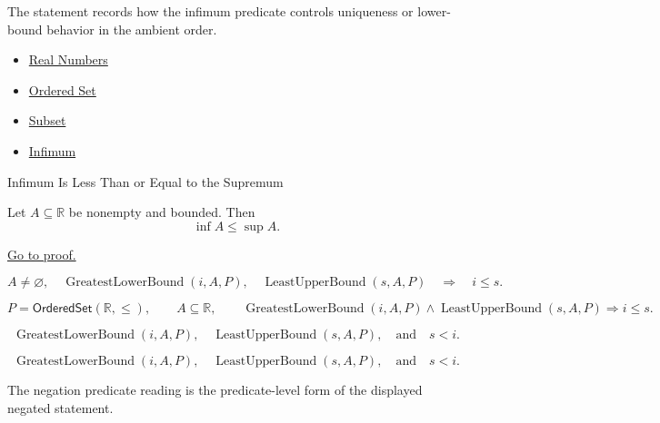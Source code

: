 \begin{remark*}[Interpretation]
The statement records how the infimum predicate controls uniqueness or lower-bound behavior in the ambient order.
\end{remark*}

\begin{dependencies}
\begin{itemize}
  \item \hyperref[def:reals]{Real Numbers}
  \item \hyperref[def:ordered-set]{Ordered Set}
  \item \hyperref[def:subset]{Subset}
  \item \hyperref[def:infimum]{Infimum}
\end{itemize}
\end{dependencies}

\begin{theorembox}{Infimum Is Less Than or Equal to the Supremum}
\begin{theorem}
\label{thm:infimum-less-than-supremum}
Let $A\subseteq\mathbb{R}$ be nonempty and bounded. Then
\[
  \inf A\leq\sup A.
\]

\hyperref[prf:infimum-less-than-supremum]{Go to proof.}
\end{theorem}
\end{theorembox}

\begin{remark*}
\[
  A\neq\varnothing,\quad
  \operatorname{GreatestLowerBound}(i,A,P),\quad
  \operatorname{LeastUpperBound}(s,A,P)
  \quad\Longrightarrow\quad
  i\leq s.
\]
\end{remark*}

\begin{remark*}
\[
  P=\mathsf{OrderedSet}(\mathbb{R},\leq),\qquad A\subseteq\mathbb{R},\qquad
  \operatorname{GreatestLowerBound}(i,A,P)\land\operatorname{LeastUpperBound}(s,A,P)
  \Longrightarrow i\leq s.
\]
\end{remark*}

\begin{remark*}
\[
  \operatorname{GreatestLowerBound}(i,A,P),\quad \operatorname{LeastUpperBound}(s,A,P),
  \quad\text{and}\quad s<i.
\]
\end{remark*}

\begin{remark*}
\[
  \operatorname{GreatestLowerBound}(i,A,P),\quad \operatorname{LeastUpperBound}(s,A,P),
  \quad\text{and}\quad s<i.
\]

The negation predicate reading is the predicate-level form of the displayed negated statement.
\end{remark*}

